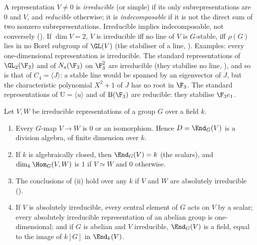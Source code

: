 \begin{definition}\label{def:reps:irreducible}
A representation $V\ne0$ is \emph{irreducible} (or simple) if its only subrepresentations are $0$ and $V$, and \emph{reducible}
otherwise; it is \emph{indecomposable} if it is not the direct sum of two nonzero subrepresentations. Irreducible implies
indecomposable, not conversely (). If $\dim V=2$, $V$ is irreducible iff no line of $V$ is $G$-stable, iff $\rho(G)$
lies in no Borel subgroup of $\GL(V)$ (the stabiliser of a line, ).
Examples: every one-dimensional representation is irreducible. The standard representations of $\GL_2(\F_3)$ and of $N_s(\F_3)$ on $\F_3^2$
are irreducible (they stabilise no line, ), and so is that of $C_4=\langle J\rangle$: a stable line would be spanned by an
eigenvector of $J$, but the characteristic polynomial $X^2+1$ of $J$ has no root in $\F_3$. The standard representations of
$\mathrm U=\langle u\rangle$ and of $\mathrm B(\F_3)$ are reducible: they stabilise $\F_3e_1$.
\end{definition}

\begin{theorem}\label{thm:reps:schur}
Let $V,W$ be irreducible representations of a group $G$ over a field $k$.
\begin{enumerate}[label=(\roman*)]
\item Every $G$-map $V\to W$ is $0$ or an isomorphism. Hence $D=\End_G(V)$ is a division algebra, of finite dimension over $k$.
\item If $k$ is algebraically closed, then $\End_G(V)=k$ (the scalars), and $\dim_k\Hom_G(V,W)$ is $1$ if $V\simeq W$ and $0$ otherwise.
\item The conclusions of (ii) hold over any $k$ if $V$ and $W$ are absolutely irreducible ().
\item If $V$ is absolutely irreducible, every central element of $G$ acts on $V$ by a scalar; every absolutely irreducible
representation of an abelian group is one-dimensional; and if $G$ is abelian and $V$ irreducible, $\End_G(V)$ is a field, equal
to the image of $k[G]$ in $\End_k(V)$.
\end{enumerate}
\end{theorem}

